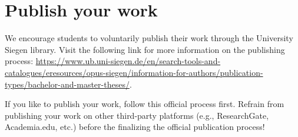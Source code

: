 \section{Publish your work}
\label{sec:publish}
We encourage students to voluntarily publish their work through the University Siegen library. Visit the following link for more information on the publishing process: \href{https://www.ub.uni-siegen.de/en/search-tools-and-catalogues/eresources/opus-siegen/information-for-authors/publication-types/bachelor-and-master-theses/}{https://www.ub.uni-siegen.de/en/search-tools-and-catalogues/eresources/opus-siegen/information-for-authors/publication-types/bachelor-and-master-theses/}.

If you like to publish your work, follow this official process first. Refrain from publishing your work on other third-party platforms (e.g., ResearchGate, Academia.edu, etc.) before the finalizing the official publication process! 